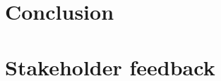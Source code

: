 \documentclass[a4paper,12pt,oneside,openany]{book}
\begin{document}
\chapter{Conclusion}
\label{cap5}


\normalsize
\cleardoublepage
{}



\chapter{Stakeholder feedback}
\label{ApendiceC}
   

\backmatter
\end{document}
